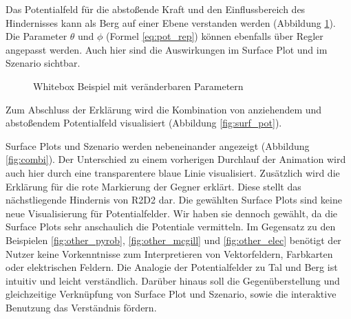Das Potentialfeld für die abstoßende Kraft und den Einflussbereich des Hindernisses kann als Berg auf einer Ebene verstanden werden (Abbildung \ref{fig:surf_rep}). Die Parameter $\theta$ und $\phi$ (Formel \ref{eq:pot_rep}) können ebenfalls über Regler angepasst werden. Auch hier sind die Auswirkungen im Surface Plot und im Szenario sichtbar.
\begin{figure}[h!]
  \centering
  \caption{Whitebox Beispiel mit veränderbaren Parametern}
  \label{fig:surf_rep}
\end{figure}
Zum Abschluss der Erklärung wird die Kombination von anziehendem und abstoßendem Potentialfeld visualisiert (Abbildung \ref{fig:surf_pot}).

Surface Plots und Szenario werden nebeneinander angezeigt  (Abbildung \ref{fig:combi}).
Der Unterschied zu einem vorherigen Durchlauf der Animation wird auch hier durch eine transparentere blaue Linie visualisiert. Zusätzlich wird die Erklärung für die rote Markierung der Gegner erklärt. Diese stellt das nächstliegende Hindernis von R2D2 dar. 
Die gewählten Surface Plots sind keine neue Visualisierung für Potentialfelder. Wir haben sie dennoch gewählt, da die Surface Plots sehr anschaulich die Potentiale vermitteln. Im Gegensatz zu den Beispielen \ref{fig:other_pyrob}, \ref{fig:other_mcgill} und \ref{fig:other_elec} benötigt der Nutzer keine Vorkenntnisse zum Interpretieren von Vektorfeldern, Farbkarten oder elektrischen Feldern. Die Analogie der Potentialfelder zu Tal und Berg ist intuitiv und leicht verständlich.
Darüber hinaus soll die Gegenüberstellung und gleichzeitige Verknüpfung von Surface Plot und Szenario, sowie die interaktive Benutzung das Verständnis fördern.

